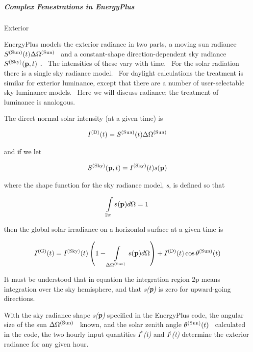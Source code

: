 \subparagraph{Complex Fenestrations in EnergyPlus}\label{complex-fenestrations-in-energyplus}

Exterior

EnergyPlus models the exterior radiance in two parts, a moving sun radiance \({S^{{\rm{(Sun)}}}}(t)\Delta {\Omega ^{{\rm{(Sun)}}}}\) ~and a constant-shape direction-dependent sky radiance \({S^{{\rm{(Sky)}}}}({\bf{p}},t)\) .~ The intensities of these vary with time.~ For the solar radiation there is a single sky radiance model.~ For daylight calculations the treatment is similar for exterior luminance, except that there are a number of user-selectable sky luminance models.~ Here we will discuss radiance; the treatment of luminance is analogous.

The direct normal solar intensity (at a given time) is

\begin{equation}
{I^{{\rm{(D)}}}}(t) = {S^{{\rm{(Sun)}}}}(t)\Delta {\Omega ^{{\rm{(Sun)}}}}
\end{equation}

and if we let

\begin{equation}
{S^{{\rm{(Sky)}}}}({\bf{p}},t) = {I^{{\rm{(Sky)}}}}(t)s({\bf{p}})
\end{equation}

where the shape function for the sky radiance model, \emph{s}, is defined so that

\begin{equation}
\int\limits_{2\pi } {s({\bf{p}})d\Omega }  = 1
\end{equation}

then the global solar irradiance on a horizontal surface at a given time is

\begin{equation}
{I^{{\rm{(G)}}}}(t) = {I^{{\rm{(Sky)}}}}(t)\left( {1 - \int\limits_{\Delta {\Omega ^{{\rm{(Sun)}}}}} {s({\bf{p}})d\Omega } } \right) + {I^{{\rm{(D)}}}}(t)\cos {\theta ^{{\rm{(Sun)}}}}(t)
\end{equation}

It must be understood that in equation the integration region 2p means integration over the sky hemisphere, and that \emph{s(\textbf{p})} is zero for upward-going directions.

With the sky radiance shape \emph{s(\textbf{p})} specified in the EnergyPlus code, the angular size of the sun \(\Delta {\Omega ^{{\rm{(Sun)}}}}\) ~known, and the solar zenith angle \({\theta ^{{\rm{(Sun)}}}}(t)\) ~calculated in the code, the two hourly input quantities \emph{I}\(^{*}\)\emph{(t)} and \emph{I}\(^{)}\)\emph{(t)} determine the exterior radiance for any given hour.

